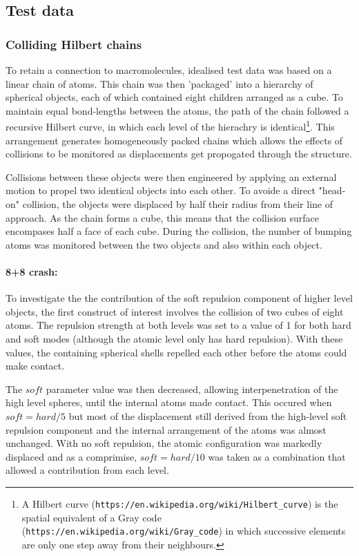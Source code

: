 \subsection{Test data}

\subsubsection{Colliding Hilbert chains}

To retain a connection to macromolecules, idealised test data was based on a linear chain of atoms.
This chain was then 'packaged' into a hierarchy of spherical objects, each of which contained
eight children arranged as a cube.   To maintain equal bond-lengths between the atoms, the path of the
chain followed a recursive Hilbert curve, in which each level of the hierachry is identical\footnote{
A Hilbert curve ({\tt https://en.wikipedia.org/wiki/Hilbert\_curve}) is the spatial equivalent of a 
Gray code ({\tt https://en.wikipedia.org/wiki/Gray\_code}) in which successive elements are
only one step away from their neighbours.
}.   This arrangement generates homogeneously packed chains which allows the effects of collisions
to be monitored as displacements get propogated through the structure.

Collisions between these objects were then engineered by applying an external
motion to propel two identical objects into each other.   To avoide a direct "head-on"
collision, the objects were displaced by half their radius from their line of approach.
As the chain forms a cube, this means that the collision surface encompases
half a face of each cube.
During the collision, the number of bumping atoms was monitored between the two objects
and also within each object.

\paragraph{8+8 crash:\\}

To investigate the the contribution of the soft repulsion component of higher level objects,
the first construct of interest involves the collision of two cubes of eight atoms.  The
repulsion strength at both levels was set to a value of 1 for both hard and soft modes
(although the atomic level only has hard repulsion).   With these values, the containing
spherical shells repelled each other before the atoms could make contact.

The $soft$ parameter value was then decreased, allowing interpenetration of the high
level spheres,  until the internal atoms made contact.   This occured when $soft = hard/5$
but most of the displacement still derived from the high-level soft repulsion component
and the internal arrangement of the atoms was almost unchanged.   With no soft repulsion,
the atomic configuration was markedly displaced and as a comprimise, $soft = hard/10$
was taken as a combination that allowed a contribution from each level.

